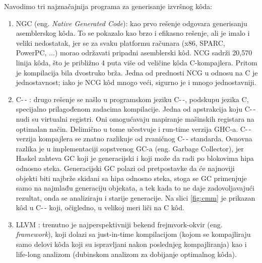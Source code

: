 Navodimo tri najznačajnija programa za generisanje izvršnog k\^{o}da:
\begin{enumerate}
	\item  NGC (eng. \emph{Native Generated Code}): kao prvo rešenje odgovara generisanju asemblerskog k\^{o}da. To se pokazalo kao brzo i efikasno rešenje, ali je imalo i veliki nedostatak, jer se za svaku platformu računara (x86, SPARC, PowerPC, ...) morao održavati pripadni asemblerski k\^{o}d.
	NCG sadrži 20,570 linija k\^{o}da, što je približno 4 puta više od veličine k\^{o}da C-kompajlera. Pritom je kompilacija bila dvostruko brža. Jedna od prednosti NCG u odnosu na C je jednostavnost; iako je NCG k\^{o}d mnogo veći, sigurno je i mnogo jednostavniji.
	\item  C-\,- : drugo rešenje se našlo u programskom jeziku C-\,-, podskupu jezika C, specijalno prilagođenom zadacima kompilacije. Jedna od apstrakcija koju C-\,- nudi su virtualni registri. Oni omogućavaju mapiranje mašinskih registara na optimalan način. Delimično u tome učestvuje i run-time verzija GHC-a. C-\,- verzija kompajlera se znatno razlikuje od zvaničnog C-\,- standarda. Osnovna razlika je u  implementaciji sopstvenog GC-a (eng. Garbage Collector), jer Haskel zahteva GC koji je generacijski i koji može da radi po blokovima hipa odnosno steka. Generacijski GC polazi od pretpostavke da će najnoviji objekti biti najbrže skidani sa hipa odnosno steka, stoga se GC primenjuje samo na najmlađu generaciju objekata, a tek kada to ne daje zadovoljavajući rezultat, onda se analiziraju i starije generacije. Na slici \ref{fig:cmm} je prikazan k\^{o}d u C-\,- koji, očigledno, u velikoj meri liči na C k\^{o}d. 
	\item LLVM : trenutno je najperspektivniji bekend frejmvork-okvir (eng. \emph{framework}), koji dolazi sa just-in-time kompilacijom (kojom se kompajliraju samo delovi k\^{o}da koji su ispravljani nakon poslednjeg kompajliranja) kao i life-long analizom (dubinskom analizom za dobijanje optimalnog k\^{o}da).
	

\end{enumerate}
